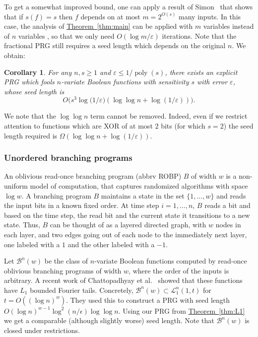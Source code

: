 \documentclass[11pt]{article}
\numberwithin{equation}{section}
\newtheorem{corollary}[theorem]{Corollary}
\theoremstyle{definition}
\theoremstyle{plain}
\newcommand{\expref}[2]{\hyperref[#2]{#1~\ref{#2}}}
\newcommand{\LL}{\mathcal{L}}
\newcommand{\BB}{\mathcal{B}}
\newcommand{\eps}{\varepsilon}
\DeclareMathOperator{\poly}{poly}      %
\begin{document}
To get a somewhat improved bound, one can apply a result of Simon~\cite{simon1983tight} that shows that if $s(f)=s$
then $f$ depends on at most $m=2^{O(s)}$ many inputs. In this case, the analysis of \expref{Theorem}{thm:main} can be applied
with $m$ variables instead of $n$ variables , so that we only need $O(\log m/\eps)$ iterations. Note that the fractional PRG still requires
a seed length which depends on the original $n$. We obtain:

\begin{corollary}
\label{cor:sensitivity}
For any $n,s \ge 1$ and $\eps\leq 1/\poly(s)$, there exists an
explicit PRG which fools $n$-variate Boolean functions with
sensitivity $s$ with error $\eps$, whose seed length is
\[
  O\bigl(s^3 \log\bigl(1/\eps) (\log\log n + \log(1/\eps))\bigr).
\]
\end{corollary}

We note that the $\log\log n$ term cannot be removed. Indeed, even if we restrict attention to functions which are XOR of at most $2$ bits (for which $s=2$) the seed length required is $\Omega(\log\log n + \log(1/\eps))$.

\subsubsection{Unordered branching programs}
An oblivious read-once branching program (abbrv ROBP) $B$ of width $w$ is a non-uniform model of computation, that captures randomized algorithms with space $\log w$.  A branching program $B$ maintains a state in the set $\{1,\ldots,w\}$ and reads the input bits in a known fixed order. At time step $i =1,\ldots,n$, $B$ reads a bit and based on the time step, the read bit and the current state it transitions to a new state.
Thus, $B$ can be thought of as a layered directed graph, with $w$ nodes in each layer, and two edges going out of each node to the immediately next layer, one labeled with a $1$ and the other labeled with a $-1$.

Let $\BB^n(w)$ be the class of $n$-variate Boolean functions computed by read-once oblivious branching programs of width $w$,
where the order of the inputs is arbitrary.
A recent work of Chattopadhyay {et al.}~\cite{chattopadhyay2018improved} showed that these functions
have $L_1$ bounded Fourier tails. Concretely, $\BB^n(w) \subset \LL_1^n(1,t)$ for $t=O((\log n)^w)$.
They used this to construct a PRG with seed length $O(\log n)^{w-1} \log^2(n/\epsilon)\log \log n$.
Using our PRG from \expref{Theorem}{thm:L1} we get a comparable (although slightly worse) seed length.
Note that $\BB^n(w)$ is closed under restrictions.
\end{document}
